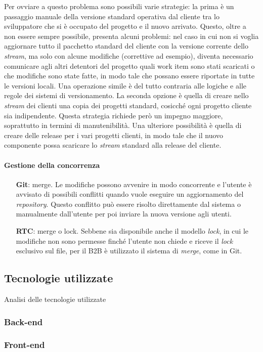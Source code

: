 Per ovviare a questo problema sono possibili varie strategie: la prima è un passaggio manuale della versione standard operativa dal cliente tra lo sviluppatore che si è occupato del progetto e il nuovo arrivato. Questo, oltre a non essere sempre possibile, presenta alcuni problemi: nel caso in cui non si voglia aggiornare tutto il pacchetto standard del cliente con la versione corrente dello \textit{stream}, ma solo con alcune modifiche (correttive ad esempio), diventa necessario comunicare agli altri detentori del progetto quali work item sono stati scaricati o che modifiche sono state fatte, in modo tale che possano essere riportate in tutte le versioni locali. Una operazione simile è del tutto contraria alle logiche e alle regole dei sistemi di versionamento. La seconda opzione è quella di creare nello \textit{stream} dei clienti una copia dei progetti standard, cosicché ogni progetto cliente sia indipendente. Questa strategia richiede però un impegno maggiore, soprattutto in termini di manutenibilità. Una ulteriore possibilità è quella di creare delle release per i vari progetti clienti, in modo tale che il nuovo componente possa scaricare lo \textit{stream} standard alla release del cliente.

\paragraph*{Gestione della concorrenza}
\begin{itemize}
	\item[\textbf{Git}:] merge. Le modifiche possono avvenire in modo concorrente e l'utente è avvisato di possibili conflitti quando vuole eseguire un aggiornamento del \textit{repository}. Questo conflitto può essere risolto direttamente dal sistema o manualmente dall'utente per poi inviare la nuova versione agli utenti.
	\item[\textbf{RTC}:] merge o lock. Sebbene sia disponibile anche il modello \textit{lock}, in cui le modifiche non sono permesse finché l'utente non chiede e riceve il \textit{lock} esclusivo sul file, per il B2B è utilizzato il sistema di \textit{merge}, come in Git.
\end{itemize}

\subsection{Tecnologie utilizzate}
Analisi delle tecnologie utilizzate

\subsubsection{Back-end}

\subsubsection{Front-end}
